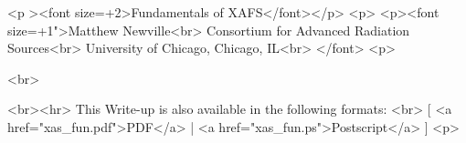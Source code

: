 
\begin{htmlonly}
  \begin{rawhtml}
    <p ><font size=+2>Fundamentals of XAFS</font></p>
    <p>
    <p><font size=+1">Matthew Newville<br>
      Consortium for Advanced Radiation Sources<br>
      University of Chicago, Chicago, IL<br>
    </font>
    <p>
  \end{rawhtml}
  \begin{rawhtml}  <br> \end{rawhtml}
  {\update}
  \begin{rawhtml}  
    <br><hr>
    This Write-up is also available in the following formats: <br>
    [ <a href="xas_fun.pdf">PDF</a> | <a href="xas_fun.ps">Postscript</a> ]
    <p>
  \end{rawhtml}
\end{htmlonly}
